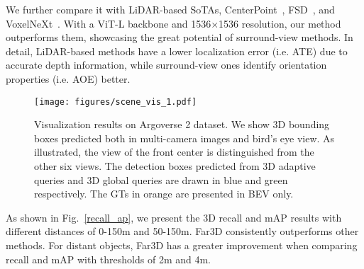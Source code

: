 \documentclass[letterpaper]{article} \usepackage{aaai24}
\begin{document}
\begin{table}[t]
    \centering
    \caption{Ablation study with different score threshold $\tau$ for 2D proposals.}
    \vspace{-0.2cm}
    \label{tab:ablate_score}
    \tiny
    \vspace{-0.3cm}
\end{table} We further compare it with LiDAR-based SoTAs, CenterPoint~\cite{yin2021center}, FSD~\cite{fan2022fully}, and VoxelNeXt~\cite{chen2023voxelnext}. With a ViT-L backbone and 1536$\times$1536 resolution, our method outperforms them, showcasing the great potential of surround-view methods. In detail, LiDAR-based methods have a lower localization error (i.e. ATE) due to accurate depth information, while surround-view ones identify orientation properties (i.e. AOE) better. 

\begin{figure*}[t!]
\centering
\texttt{[image: figures/scene\_vis\_1.pdf]}
\caption{Visualization results on Argoverse 2 dataset. 
We show 3D bounding boxes predicted both in multi-camera images and bird’s eye view. 
As illustrated, the view of the front center is distinguished from the other six views. The detection boxes predicted from 3D adaptive queries and 3D global queries are drawn in blue and green respectively. The GTs in orange are presented in BEV only.}
\vspace{-0.3cm}
\label{scene_vis}
\end{figure*}
As shown in Fig.~\ref{recall_ap}, we present the 3D recall and mAP results with different distances of 0-150m and 50-150m. Far3D consistently outperforms other methods. For distant objects, Far3D has a greater improvement when comparing recall and mAP with thresholds of 2m and 4m.
\end{document}
